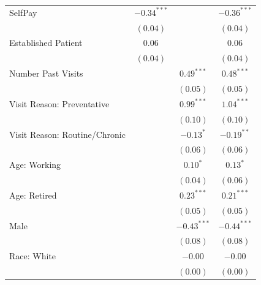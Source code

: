 \documentclass[12pt,twoside]{reedthesis}
\begin{document}
\begin{table}
\begin{center}
\begin{small}
\begin{tabular}{l c c c }
  SelfPay                       & $\mathbf{-0.34}^{***}$ &                        & $\mathbf{-0.36}^{***}$ \\
                                & $(0.04)$               &                        & $(0.04)$               \\
  Established Patient           & $0.06$                 &                        & $0.06$                 \\
                                & $(0.04)$               &                        & $(0.04)$               \\
  Number Past Visits            &                        & $\mathbf{0.49}^{***}$  & $\mathbf{0.48}^{***}$  \\
                                &                        & $(0.05)$               & $(0.05)$               \\
  Visit Reason: Preventative    &                        & $\mathbf{0.99}^{***}$  & $\mathbf{1.04}^{***}$  \\
                                &                        & $(0.10)$               & $(0.10)$               \\
  Visit Reason: Routine/Chronic &                        & $-0.13^{*}$            & $-0.19^{**}$           \\
                                &                        & $(0.06)$               & $(0.06)$               \\
  Age: Working                  &                        & $0.10^{*}$             & $0.13^{*}$             \\
                                &                        & $(0.04)$               & $(0.06)$               \\
  Age: Retired                  &                        & $\mathbf{0.23}^{***}$  & $\mathbf{0.21}^{***}$  \\
                                &                        & $(0.05)$               & $(0.05)$               \\
  Male                          &                        & $\mathbf{-0.43}^{***}$ & $\mathbf{-0.44}^{***}$ \\
                                &                        & $(0.08)$               & $(0.08)$               \\
  Race: White                   &                        & $-0.00$                & $-0.00$                \\
                                &                        & $(0.00)$               & $(0.00)$               \\

\end{tabular}
\end{small}
\end{center}
\end{table}
\end{document}
